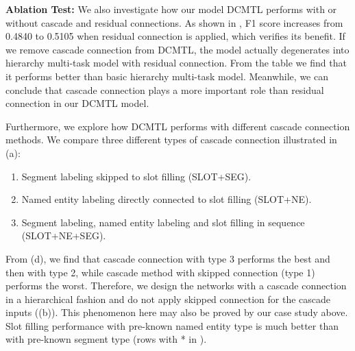 \noindent
\textbf{Ablation Test:}
We also investigate how our model DCMTL performs 
with or without cascade and residual connections.
As shown in ,
F1 score increases from 0.4840 to 0.5105 when residual connection is applied,
which verifies its benefit.
If we remove cascade connection from DCMTL,
the model actually degenerates into hierarchy multi-task model with residual connection.
From the table we find that it performs better than basic hierarchy multi-task model.
Meanwhile, we can conclude that 
cascade connection plays a more important role than residual connection in our DCMTL model.

Furthermore, 
we explore how DCMTL performs with different cascade connection methods.
We compare three different types of cascade connection 
illustrated in (a):
\begin{enumerate}[1.]
\item Segment labeling skipped to slot filling (SLOT+SEG).
\item Named entity labeling directly connected to slot filling (SLOT+NE).
\item Segment labeling, named entity labeling and slot filling in sequence (SLOT+NE+SEG).
\end{enumerate}
From (d),
we find that cascade connection with type 3 
performs the best
and then with type 2,
while cascade method with skipped connection (type 1) performs the worst.
Therefore, we design the networks 
with a cascade connection in a hierarchical fashion
and do not apply skipped connection for the cascade 
inputs ((b)).
This phenomenon here may also be proved by our case study above.
Slot filling performance with pre-known named entity type is 
much better than with pre-known segment type
(rows with * in ).
